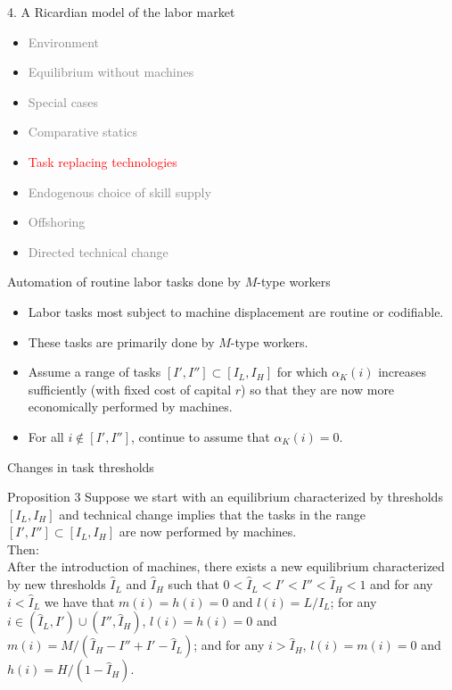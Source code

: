 \documentclass[notes=show]{beamer}
\begin{document}
\begin{frame}{4. A Ricardian model of the labor market}
\begin{itemize}
\item[\textcolor{gray}{4.1}] \textcolor{gray}{Environment}
\item[\textcolor{gray}{4.2}] \textcolor{gray}{Equilibrium without machines}
\item[\textcolor{gray}{4.3}] \textcolor{gray}{Special cases}
\item[\textcolor{gray}{4.4}] \textcolor{gray}{Comparative statics}
\item[\textcolor{red}{4.5}] \textcolor{red}{Task replacing technologies}
\item[\textcolor{gray}{4.6}] \textcolor{gray}{Endogenous choice of skill supply}
\item[\textcolor{gray}{4.7}] \textcolor{gray}{Offshoring}
\item[\textcolor{gray}{4.8}] \textcolor{gray}{Directed technical change}
\end{itemize}
\end{frame}

\begin{frame}{Automation of routine labor tasks done by $M$-type workers}
\begin{itemize}
\item Labor tasks most subject to machine displacement are routine or codifiable. \medskip
\item These tasks are primarily done by $M$-type workers. \medskip
\item Assume a range of tasks $[I',I''] \subset [I_{L},I_{H}]$ for which $\alpha_{K}(i)$ increases sufficiently (with fixed cost of capital $r$) so that they are now more economically performed by machines. \medskip
\item For all $i \notin [I',I'']$, continue to assume that $\alpha_{K}(i)=0$. 
\end{itemize}
\end{frame}

\begin{frame}{Changes in task thresholds}
\begin{block}{Proposition 3}
Suppose we start with an equilibrium characterized by thresholds $[I_{L},I_{H}]$ and technical change implies that the tasks in the range $[I',I''] \subset [I_{L},I_{H}]$ are now performed by machines. \\ \medskip
Then: \\ \medskip
After the introduction of machines, there exists a new equilibrium characterized by new thresholds $\hat{I}_{L}$ and $\hat{I}_{H}$ such that $0 < \hat{I}_{L} < I' < I'' < \hat{I}_{H} < 1$ and for any $i < \hat{I}_{L}$ we have that $m(i)=h(i)=0$ and $l(i)=L/\hat{I}_{L}$; for any $i \in (\hat{I}_{L},I') \cup (I'',\hat{I}_{H})$, $l(i)=h(i)=0$ and $m(i)=M/(\hat{I}_{H} - I'' + I' - \hat{I}_{L})$; and for any $i > \hat{I}_{H}$,  $l(i)=m(i)=0$ and $h(i)=H/(1-\hat{I}_{H})$.
\end{block}
\end{frame}
\end{document}
